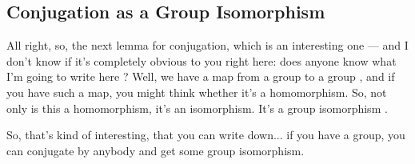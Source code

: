 \subsection{Conjugation as a Group Isomorphism}

\begin{speech}[00:19:03 - 00:19:43]
All right, so, the next lemma for conjugation, which is an interesting one --- and I don't know if it's completely obvious to you right here: does anyone know what I'm going to write here ?  Well, we have a map from a group to a group , and if you have such a map, you might think whether it's a homomorphism. So, not only is this a homomorphism, it's an isomorphism. It's a group isomorphism .

So, that's kind of interesting, that you can write down... if you have a group, you can conjugate by anybody and get some group isomorphism.
\end{speech}

\begin{content}
\end{content}

